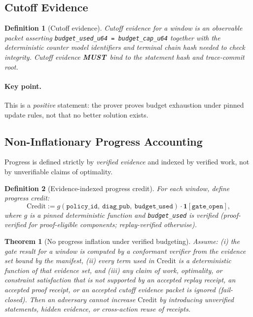 \documentclass[11pt]{article}
\newcommand{\MUST}{\textbf{MUST}}
\newtheorem{definition}{Definition}
\newtheorem{theorem}{Theorem}
\begin{document}
\subsection{Cutoff Evidence}

\begin{definition}[Cutoff evidence]
Cutoff evidence for a window is an observable packet asserting \texttt{budget\_used\_u64 = budget\_cap\_u64} together with the deterministic counter model identifiers and terminal chain hash needed to check integrity. Cutoff evidence \MUST\ bind to the statement hash and trace-commit root.
\end{definition}

\paragraph{Key point.}
This is a \emph{positive} statement: the prover proves budget exhaustion under pinned update rules, not that no better solution exists.

\subsection{Non-Inflationary Progress Accounting}

Progress is defined strictly by \emph{verified evidence} and indexed by verified work, not by unverifiable claims of optimality.

\begin{definition}[Evidence-indexed progress credit]
For each window, define progress credit:
\[
\mathrm{Credit} := g(\texttt{policy\_id},\ \texttt{diag\_pub},\ \texttt{budget\_used})\cdot \mathbf{1}[\texttt{gate\_open}],
\]
where $g$ is a pinned deterministic function and \texttt{budget\_used} is verified (proof-verified for proof-eligible components; replay-verified otherwise).
\end{definition}

\begin{theorem}[No progress inflation under verified budgeting]\label{thm:npi}
Assume:
(i) the gate result for a window is computed by a conformant verifier from the evidence set bound by the manifest,
(ii) every term used in $\mathrm{Credit}$ is a deterministic function of that evidence set, and
(iii) any claim of work, optimality, or constraint satisfaction that is not supported by an accepted replay receipt, an accepted proof receipt, or an accepted cutoff evidence packet is ignored (fail-closed).
Then an adversary cannot increase $\mathrm{Credit}$ by introducing unverified statements, hidden evidence, or cross-action reuse of receipts.
\end{theorem}
\end{document}
